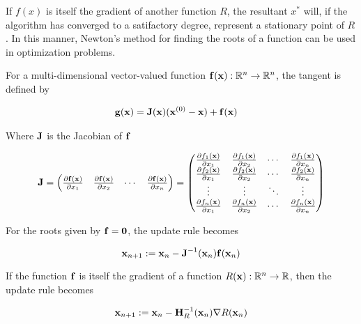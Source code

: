 \documentclass{article}
\newcommand{\R}{\mathbb{R}}
\newcommand{\vect}[1]{\textbf{\textrm{#1}}}
\newcommand{\pd}[2]{\frac{\partial {#1}}{\partial {#2}}}
\begin{document}
If $f(x)$ is itself the gradient of another function $R$, the resultant $x^*$ will, if the algorithm has converged to a satifactory degree, represent a stationary point of $R$. 
In this manner, Newton's method for finding the roots of a function can be used in optimization problems. \par 
\hfill \newline
For a multi-dimensional vector-valued function $\vect{f}(\vect{x}): \R^n \rightarrow \R^n$, the tangent is defined by

\begin{align} \label{tangent}
	\vect{g}(\vect{x}) & = \vect{J}(\vect{x})(\vect{x}^{(0)} - \vect{x}) + \vect{f}(\vect{x})
\end{align}

Where $\vect{J}$ is the Jacobian of $\vect{f}$

\begin{equation*}
	\vect{J} = 
	\begin{pmatrix}
		\pd{\vect{f}(\vect{x})}{x_1} & \pd{\vect{f}(\vect{x})}{x_2} & \cdots 
		& \pd{\vect{f}(\vect{x})}{x_n}
	\end{pmatrix} = 
	\begin{pmatrix}
		\pd{f_1(\vect{x})}{x_1} & \pd{f_1(\vect{x})}{x_2} & \cdots & \pd{f_1(\vect{x})}{x_n} \\
		\pd{f_2(\vect{x})}{x_1} & \pd{f_2(\vect{x})}{x_2} & \cdots & \pd{f_2(\vect{x})}{x_n} \\
		\vdots & \vdots & \ddots & \vdots \\
		\pd{f_n(\vect{x})}{x_1} & \pd{f_n(\vect{x})}{x_2} & \cdots & \pd{f_n(\vect{x})}{x_n}
	\end{pmatrix}
\end{equation*}

For the roots given by $\vect{f} = \vect{0}$, the update rule becomes

\begin{equation} \label{updaterule}
	\vect{x}_{n+1} := \vect{x}_n - \vect{J}^{-1}(\vect{x}_n)\vect{f}(\vect{x}_n)	
\end{equation}

If the function $\vect{f}$ is itself the gradient of a function $R(\vect{x}): \R^n \rightarrow \R$, then the update rule becomes

\begin{equation} \label{updateruledog}
	\vect{x}_{n+1} := \vect{x}_n - \vect{H}_R^{-1}(\vect{x}_n)\nabla R(\vect{x}_n)
\end{equation}
\end{document}
